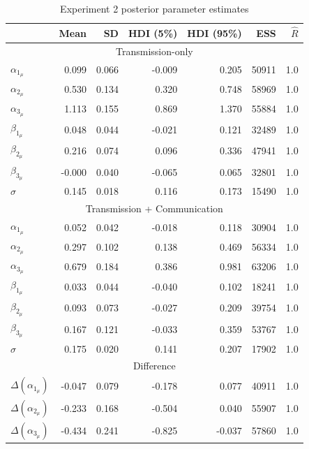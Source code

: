 \documentclass[doc,biblatex]{apa7}
\begin{document}
\begin{table}
\begin{center}
\begin{threeparttable}
\caption{Experiment 2 posterior parameter estimates}
\footnotesize
\begin{tabular}{lrrrrrr}
\toprule
 &   Mean &     SD &  HDI (5\%) &  HDI (95\%) &  ESS &  $\hat{R}$ \\
\midrule
\multicolumn{7}{c}{Transmission-only} \\
$\alpha_{1_\mu}$ &  0.099 &  0.066 &  -0.009 &    0.205 &   50911 &    1.0 \\
$\alpha_{2_\mu}$ &  0.530 &  0.134 &   0.320 &    0.748 &   58969 &    1.0 \\
$\alpha_{3_\mu}$ &  1.113 &  0.155 &   0.869 &    1.370 &   55884 &    1.0 \\
$\beta_{1_\mu}$ &  0.048 &  0.044 &  -0.021 &    0.121 &   32489 &    1.0 \\
$\beta_{2_\mu}$ &  0.216 &  0.074 &   0.096 &    0.336 &   47941 &    1.0 \\
$\beta_{3_\mu}$ & -0.000 &  0.040 &  -0.065 &    0.065 &   32801 &    1.0 \\
$\sigma$      &  0.145 &  0.018 &   0.116 &    0.173 &   15490 &    1.0 \\
\midrule
\multicolumn{7}{c}{Transmission + Communication} \\
$\alpha_{1_\mu}$ &  0.052 &  0.042 &  -0.018 &    0.118 &   30904 &    1.0 \\
$\alpha_{2_\mu}$ &  0.297 &  0.102 &   0.138 &    0.469 &   56334 &    1.0 \\
$\alpha_{3_\mu}$ &  0.679 &  0.184 &   0.386 &    0.981 &   63206 &    1.0 \\
$\beta_{1_\mu}$ &  0.033 &  0.044 &  -0.040 &    0.102 &   18241 &    1.0 \\
$\beta_{2_\mu}$ &  0.093 &  0.073 &  -0.027 &    0.209 &   39754 &    1.0 \\
$\beta_{3_\mu}$ &  0.167 &  0.121 &  -0.033 &    0.359 &   53767 &    1.0 \\
$\sigma$      &  0.175 &  0.020 &   0.141 &    0.207 &   17902 &    1.0 \\
\midrule
\multicolumn{7}{c}{Difference} \\
$\Delta(\alpha_{1_\mu})$     & -0.047 &  0.079 &  -0.178 &    0.077 &   40911 &    1.0 \\
$\Delta(\alpha_{2_\mu})$     & -0.233 &  0.168 &  -0.504 &    0.040 &   55907 &    1.0 \\
$\Delta(\alpha_{3_\mu})$     & -0.434 &  0.241 &  -0.825 &   -0.037 &   57860 &    1.0 \\

\end{tabular}
\end{threeparttable}
\end{center}
\end{table}
\end{document}

